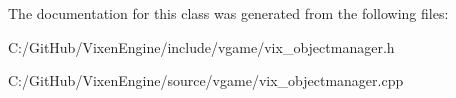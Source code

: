 The documentation for this class was generated from the following files\+:\begin{DoxyCompactItemize}
\item 
C\+:/\+Git\+Hub/\+Vixen\+Engine/include/vgame/vix\+\_\+objectmanager.\+h\item 
C\+:/\+Git\+Hub/\+Vixen\+Engine/source/vgame/vix\+\_\+objectmanager.\+cpp\end{DoxyCompactItemize}
